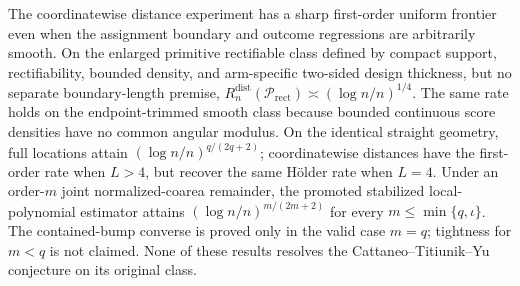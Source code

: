 The coordinatewise distance experiment has a sharp first-order uniform frontier even when the assignment boundary and outcome regressions are arbitrarily smooth.  On the enlarged primitive rectifiable class defined by compact support, rectifiability, bounded density, and arm-specific two-sided design thickness, but no separate boundary-length premise, \(R_n^{\mathrm{dist}}(\mathcal P_{\mathrm{rect}})\asymp(\log n/n)^{1/4}\).  The same rate holds on the endpoint-trimmed smooth class because bounded continuous score densities have no common angular modulus.  On the identical straight geometry, full locations attain \((\log n/n)^{q/(2q+2)}\); coordinatewise distances have the first-order rate when \(L>4\), but recover the same H\"older rate when \(L=4\).  Under an order-\(m\) joint normalized-coarea remainder, the promoted stabilized local-polynomial estimator attains \((\log n/n)^{m/(2m+2)}\) for every \(m\leq\min\{q,\iota\}\).  The contained-bump converse is proved only in the valid case \(m=q\); tightness for \(m<q\) is not claimed.  None of these results resolves the Cattaneo--Titiunik--Yu conjecture on its original class.